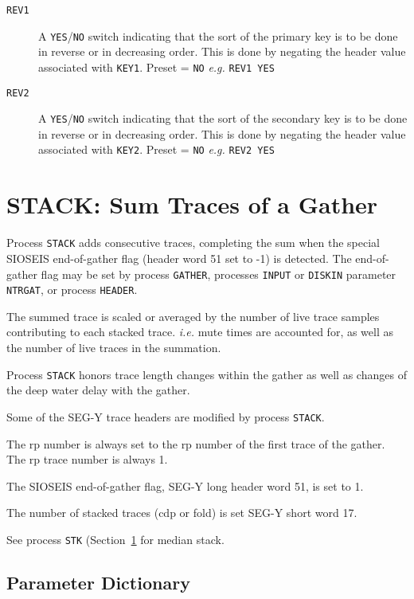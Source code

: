 \begin{description}
\item[\texttt{REV1}] A \texttt{YES}/\texttt{NO} switch indicating that the sort of the primary key
          is to be done in reverse or in decreasing order.  This is
          done by negating the header value associated with \texttt{KEY1}.
          Preset = \texttt{NO}  \textit{e.g.}     \texttt{REV1 YES}

\item[\texttt{REV2}] A \texttt{YES}/\texttt{NO} switch indicating that the sort of the secondary key
          is to be done in reverse or in decreasing order.  This is
          done by negating the header value associated with \texttt{KEY2}.
          Preset = \texttt{NO}  \textit{e.g.}     \texttt{REV2 YES}
\end{description}

\section{STACK: Sum Traces of a Gather}
\label{cmd_stack}

Process \texttt{STACK} adds consecutive traces, completing the sum when the
special SIOSEIS end-of-gather flag (header word 51 set to -1) is
detected.  The end-of-gather flag may be set by process \texttt{GATHER},
processes \texttt{INPUT} or \texttt{DISKIN} parameter \texttt{NTRGAT}, or process \texttt{HEADER}.

The summed trace is scaled or averaged by the number of live trace
samples contributing to each stacked trace.  \textit{i.e.} mute times are
accounted for, as well as the number of live traces in the summation.

Process \texttt{STACK} honors trace length changes within the \gls{gather} as well
as changes of the deep water delay with the \gls{gather}.

Some of the SEG-Y trace headers are modified by process \texttt{STACK}.

The \gls{rp} number is always set to the \gls{rp} number of the first trace of
the \gls{gather}.  The \gls{rp} trace number is always 1.

The SIOSEIS end-of-gather flag, SEG-Y long header word 51, is set to 1.

The number of stacked traces (cdp or fold) is set SEG-Y short word 17.

See process \texttt{STK} (Section~\ref{cmd_stack} for median stack.


\subsection{Parameter Dictionary}

